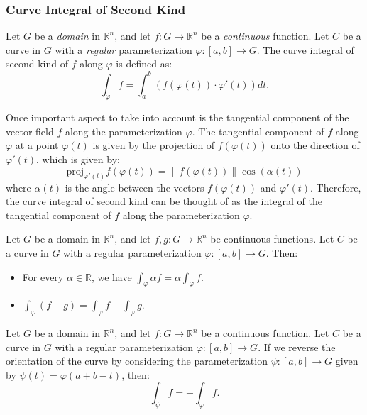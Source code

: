 \subsubsection{Curve Integral of Second Kind}
Let $G$ be a \emph{domain} in $\mathbb{R}^n$, and let $f : G \to \mathbb{R}^n$ be a \emph{continuous} function. Let $C$ be a curve in $G$ with a \emph{regular} parameterization $\varphi : [a, b] \to G$. The curve integral of second kind of $f$ along $\varphi$ is defined as:
\[
    \int_\varphi f = \int_a^b \left(f(\varphi(t)) \cdot \varphi'(t)\right) dt.
\]

Once important aspect to take into account is the tangential component of the vector field $f$ along the parameterization $\varphi$. The tangential component of $f$ along $\varphi$ at a point $\varphi(t)$ is given by the projection of $f(\varphi(t))$ onto the direction of $\varphi'(t)$, which is given by:
\[
    \text{proj}_{\varphi'(t)} f(\varphi(t)) =
    \|f(\varphi(t))\| \cos(\alpha(t))
\]
where $\alpha(t)$ is the angle between the vectors $f(\varphi(t))$ and $\varphi'(t)$. Therefore, the curve integral of second kind can be thought of as the integral of the tangential component of $f$ along the parameterization $\varphi$.

\begin{prop}
    Let $G$ be a domain in $\mathbb{R}^n$, and let $f, g : G \to \mathbb{R}^n$ be continuous functions. Let $C$ be a curve in $G$ with a regular parameterization $\varphi : [a, b] \to G$. Then:
    \begin{itemize}
        \item For every $\alpha \in \mathbb{R}$, we have $\displaystyle \int_\varphi \alpha f = \alpha \int_\varphi f$.
        \item $\displaystyle \int_\varphi (f + g) = \int_\varphi f + \int_\varphi g$.
    \end{itemize}
\end{prop}

\begin{prop}
    Let $G$ be a domain in $\mathbb{R}^n$, and let $f : G \to \mathbb{R}^n$ be a continuous function. Let $C$ be a curve in $G$ with a regular parameterization $\varphi : [a, b] \to G$. If we reverse the orientation of the curve by considering the parameterization $\psi : [a, b] \to G$ given by $\psi(t) = \varphi(a + b - t)$, then:
    \[
        \int_\psi f = -\int_\varphi f.
    \]
\end{prop}

